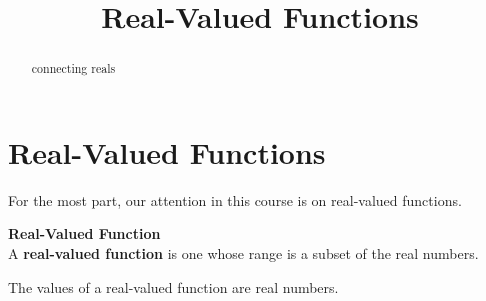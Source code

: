 \documentclass{ximera}
\title{Real-Valued Functions}
\begin{document}
\begin{abstract}
connecting reals
\end{abstract}
\maketitle




\section{Real-Valued Functions}

For the most part, our attention in this course is on real-valued functions.




\begin{definition} \textbf{\textcolor{green!50!black}{Real-Valued Function}} \\

A \textbf{real-valued function} is one whose range is a subset of the real numbers.

\end{definition}
The values of a real-valued function are real numbers.
\end{document}
